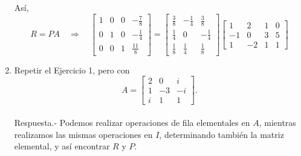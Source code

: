 \begin{enumerate}[\bfseries 1.]
	Así,
	$$
	R=PA \quad \Rightarrow \quad
	\left[
	    \begin{array}{rrrr}
		1 & 0 & 0 & -\frac{7}{8} \\
		0 & 1 & 0 & -\frac{1}{4} \\
		0 & 0 & 1 & \frac{11}{8} 
	    \end{array}
	\right]
	=
	\left[
	    \begin{array}{rrr}
		\frac{3}{8} & -\frac{1}{4} & \frac{3}{8} \\
		\frac{1}{4} & 0 & -\frac{1}{4} \\
		\frac{1}{8} & \frac{1}{4} & \frac{1}{8}
	    \end{array}
	\right]
	\left[
	    \begin{array}{*{4}{r}}
		1 & 2 & 1 & 0 \\
		-1 & 0 & 3 & 5 \\
		1 & -2 & 1 & 1
	    \end{array}
	\right]
	$$
	\vspace{.5cm}

    \item Repetir el Ejercicio 1, pero con
    $$
    A=
    \left[
	\begin{array}{*{3}{r}}
	    2 & 0 & i\\
	    1 & -3 & -i\\
	    i & 1 & 1
	\end{array}
    \right].
    $$\\

	Respuesta.-\; Podemos realizar operaciones de fila elementales en $A$, mientras realizamos las mismas operaciones en $I$, determinando también la matriz elemental, y así encontrar $R$ y $P$.


\end{enumerate}
